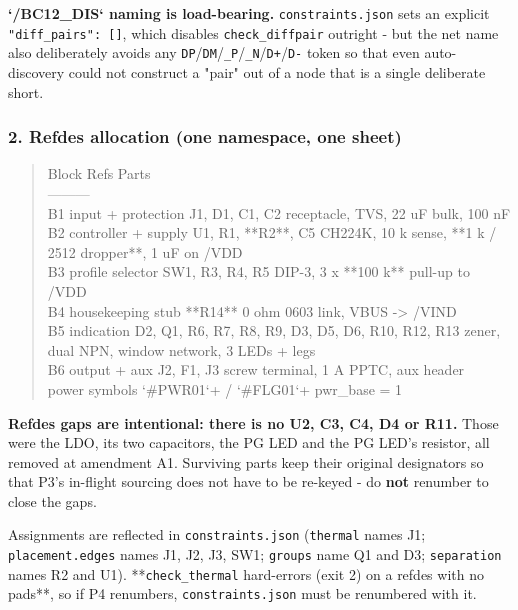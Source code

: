 \documentclass[11pt,a4paper]{article}
\begin{document}
\textbf{`/BC12\_DIS` naming is load-bearing.} \texttt{constraints.json} sets an explicit \texttt{"diff\_pairs": {[}{]}}, which disables \texttt{check\_diffpair} outright - but the net name also deliberately avoids any \texttt{DP}/\texttt{DM}/\texttt{\_P}/\texttt{\_N}/\texttt{D+}/\texttt{D-} token so that even auto-discovery could not construct a "pair" out of a node that is a single deliberate short.

\subsubsection*{2. Refdes allocation (one namespace, one sheet)}
\begin{quote}\small\ttfamily\raggedright
\textbar{} Block \textbar{} Refs \textbar{} Parts \textbar{}\\
\textbar{}---\textbar{}---\textbar{}---\textbar{}\\
\textbar{} B1 input + protection \textbar{} J1, D1, C1, C2 \textbar{} receptacle, TVS, 22 uF bulk, 100 nF \textbar{}\\
\textbar{} B2 controller + supply \textbar{} U1, R1, {*}{*}R2{*}{*}, C5 \textbar{} CH224K, 10 k sense, {*}{*}1 k / 2512 dropper{*}{*}, 1 uF on /VDD \textbar{}\\
\textbar{} B3 profile selector \textbar{} SW1, R3, R4, R5 \textbar{} DIP-3, 3 x {*}{*}100 k{*}{*} pull-up to /VDD \textbar{}\\
\textbar{} B4 housekeeping stub \textbar{} {*}{*}R14{*}{*} \textbar{} 0 ohm 0603 link, VBUS -\textgreater{} /VIND \textbar{}\\
\textbar{} B5 indication \textbar{} D2, Q1, R6, R7, R8, R9, D3, D5, D6, R10, R12, R13 \textbar{} zener, dual NPN, window network, 3 LEDs + legs \textbar{}\\
\textbar{} B6 output + aux \textbar{} J2, F1, J3 \textbar{} screw terminal, 1 A PPTC, aux header \textbar{}\\
\textbar{} power symbols \textbar{} `\#PWR01`+ / `\#FLG01`+ \textbar{} pwr\_base = 1 \textbar{}
\end{quote}
\textbf{Refdes gaps are intentional: there is no U2, C3, C4, D4 or R11.} Those were the LDO, its two capacitors, the PG LED and the PG LED's resistor, all removed at amendment A1. Surviving parts keep their original designators so that P3's in-flight sourcing does not have to be re-keyed - do \textbf{not} renumber to close the gaps.

Assignments are reflected in \texttt{constraints.json} (\texttt{thermal} names J1; \texttt{placement.edges} names J1, J2, J3, SW1; \texttt{groups} name Q1 and D3; \texttt{separation} names R2 and U1). {*}{*}\texttt{check\_thermal} hard-errors (exit 2) on a refdes with no pads{*}{*}, so if P4 renumbers, \texttt{constraints.json} must be renumbered with it.
\end{document}
